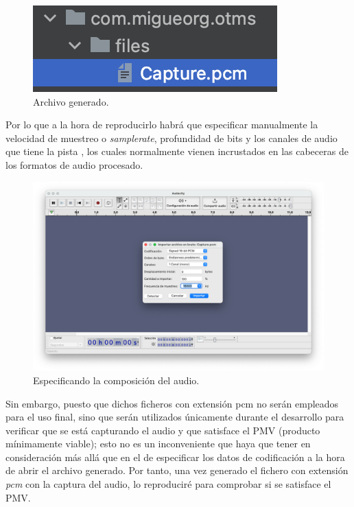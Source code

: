 \begin{figure}[htb]
    \centering
    \includegraphics{fotos/archivo_generado.png}
    \caption{Archivo generado.}
\end{figure}


Por lo que a la hora de reproducirlo habrá que especificar manualmente la
velocidad de muestreo o \emph{samplerate}, profundidad de bits y los canales de
audio que tiene la pista \cite{audio-samplerate}, los cuales normalmente vienen
incrustados en las cabeceras de los formatos de audio procesado.

\begin{figure}[htb]
    \centering
    \includegraphics[width=\textwidth]{fotos/importando_datos_en_bruto_audacity.png}
    \caption{Especificando la composición del audio.}
\end{figure}

Sin embargo, puesto que dichos ficheros con extensión pcm no serán empleados para
el uso final, sino que serán utilizados únicamente durante el desarrollo
para verificar que se está capturando el audio y que satisface el PMV (producto
mínimamente viable); esto no es un inconveniente que haya que tener en
consideración más allá que en el de especificar los datos de codificación a la
hora de abrir el archivo generado. Por tanto, una vez generado el fichero con
extensión \emph{pcm} con la captura del audio, lo reproduciré para comprobar si
se satisface el PMV. 

